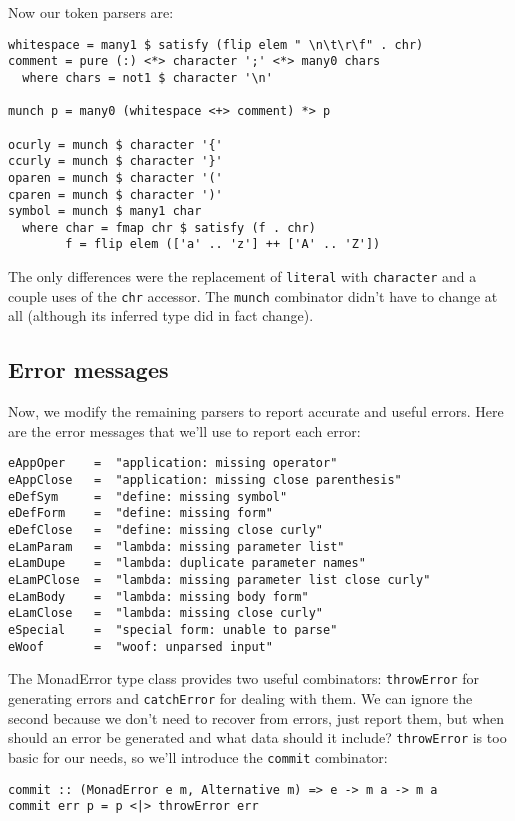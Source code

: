 \documentclass{tmr}
\begin{document}
Now our token parsers are:
\begin{verbatim}
whitespace = many1 $ satisfy (flip elem " \n\t\r\f" . chr)
comment = pure (:) <*> character ';' <*> many0 chars
  where chars = not1 $ character '\n'

munch p = many0 (whitespace <+> comment) *> p

ocurly = munch $ character '{'
ccurly = munch $ character '}'
oparen = munch $ character '('
cparen = munch $ character ')'
symbol = munch $ many1 char
  where char = fmap chr $ satisfy (f . chr)
        f = flip elem (['a' .. 'z'] ++ ['A' .. 'Z'])
\end{verbatim}

The only differences were the replacement of \verb+literal+ with \verb+character+ 
and a couple uses of the \verb+chr+ accessor.  The \verb+munch+ combinator didn't 
have to change at all (although its inferred type did in fact change).

\subsection{Error messages}
Now, we modify the remaining parsers to report accurate and useful errors.
Here are the error messages that we'll use to report each error:
\begin{verbatim}
eAppOper    =  "application: missing operator"
eAppClose   =  "application: missing close parenthesis"
eDefSym     =  "define: missing symbol"
eDefForm    =  "define: missing form"
eDefClose   =  "define: missing close curly"
eLamParam   =  "lambda: missing parameter list"
eLamDupe    =  "lambda: duplicate parameter names"
eLamPClose  =  "lambda: missing parameter list close curly"
eLamBody    =  "lambda: missing body form"
eLamClose   =  "lambda: missing close curly"
eSpecial    =  "special form: unable to parse"
eWoof       =  "woof: unparsed input"
\end{verbatim}

The MonadError type class provides two useful combinators: \verb+throwError+ for 
generating errors and \verb+catchError+ for dealing with them.  We can ignore 
the second because we don't need to recover from errors, just report them, 
but when should an error be generated and what 
data should it include?  \verb+throwError+ is too basic for our needs, so we'll 
introduce the \verb+commit+ combinator:
\begin{verbatim}
commit :: (MonadError e m, Alternative m) => e -> m a -> m a
commit err p = p <|> throwError err
\end{verbatim}
\end{document}
